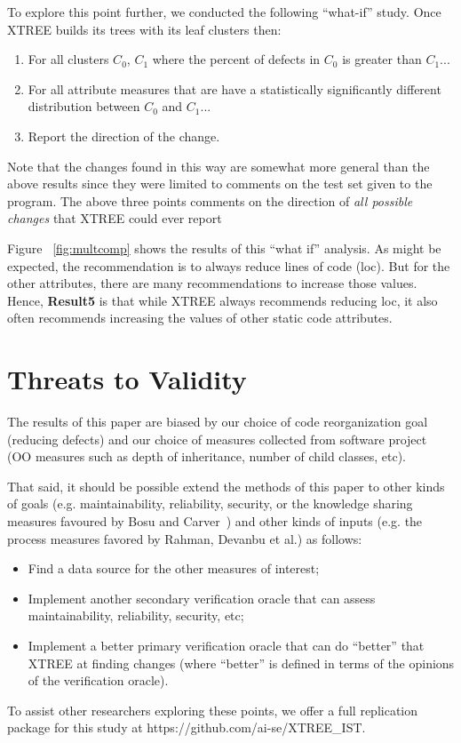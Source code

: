 \documentclass[twocolumn,5p]{elsarticle}
\newcommand{\bi}{\begin{itemize}[leftmargin=0.4cm]}
\newcommand{\ei}{\end{itemize}}
\newcommand{\be}{\begin{enumerate}}
\newcommand{\ee}{\end{enumerate}}
\theoremstyle{break}
\begin{document}
\begin{itemize}
		To explore this point further, we conducted the following ``what-if'' study. Once XTREE builds its trees with its leaf clusters then:
		\be
		\item For all clusters $C_0$, $C_1$ where the percent of defects in $C_0$ is greater than $C_1$...
		\item For all attribute measures that are have a statistically significantly different distribution  between $C_0$ and $C_1$...
		\item Report the direction of the change.
		\ee
		Note that the changes found in this way are somewhat more general than the above results
		since they were  limited
		to comments on the test set given to the program. The above three points comments on the direction of {\em all possible changes}
		that XTREE could ever report
		
		
		Figure ~\ref{fig:multcomp} shows the results of this ``what if'' analysis. As might be expected, the recommendation is to
		always reduce lines of code (loc). But for the other attributes, there are many recommendations to increase those values.
		Hence, {\bf Result5} is that while XTREE always  recommends reducing loc,
		it also   often recommends increasing the values of other static code attributes.   
		

		\section{Threats to Validity}\label{sect:valid}

The results of this paper are biased by our choice of code reorganization goal (reducing defects) and our choice
of measures collected from software project (OO measures such as
  depth of inheritance, number of child classes, etc).
  
  That said, it should be possible extend the methods of this paper to other kinds of goals (e.g. maintainability, reliability, security,
  or the knowledge sharing measures favoured by Bosu and Carver~\cite{bosu13}) and other kinds of inputs (e.g. the process measures favored by Rahman, Devanbu et al.\cite{Rahman2013})  as follows:
  \bi
  \item Find a data source for the other measures of interest;
  \item Implement another secondary verification oracle that can assess maintainability, reliability, security, etc;
\item Implement a better primary verification oracle that can do ``better'' that XTREE at finding changes (where ``better'' is defined in terms 
of the opinions of the verification oracle).
\ei
To assist other researchers exploring these points, we offer a full replication package for this study at  https://github.com/ai-se/XTREE\_IST.


\end{itemize}
\end{document}
